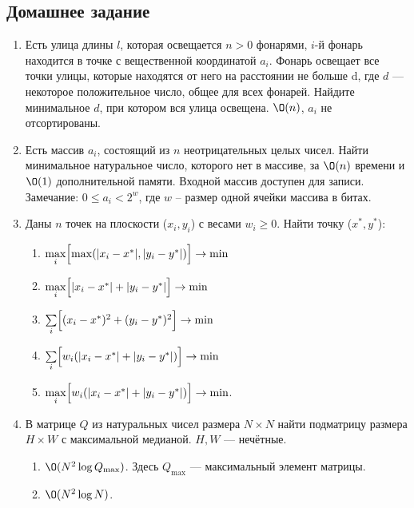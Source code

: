 \subsection{Домашнее задание}
\begin{enumerate}
  \item
    Есть улица длины $l$, которая освещается $n > 0$ фонарями, $i$-й фонарь находится в
    точке с вещественной координатой $a_i$. Фонарь освещает все точки улицы, которые находятся от него на расстоянии не больше d, где $d$ — некоторое
    положительное число, общее для всех фонарей.
    Найдите минимальное $d$, при котором вся улица освещена. $\O(n)$, $a_i$ не отсортированы.

  \item
    Есть массив $a_i$, состоящий из $n$ неотрицательных целых чисел. Найти минимальное натуральное
    число, которого нет в массиве, за $\O(n)$ времени и $\O(1)$ дополнительной памяти.
    Входной массив доступен для записи. \\
    Замечание: $0 \leq a_i < 2^w$, где $w$ -- размер одной ячейки массива в битах.

  \item
    Даны $n$ точек на плоскости ($x_i, y_i$) с весами $w_i \ge 0$. Найти точку ($x^{*}, y^{*}$):
    \begin{enumerate}
      \item {} $\max\limits_i \Bigl[ \max(|x_i-x^{*}|, |y_i-y^{*}|) \Bigr] \rightarrow \min$
      \item {} $\max\limits_i \Bigl[ |x_i-x^{*}|+|y_i-y^{*}|  \Bigr] \rightarrow \min$
      \item {} $\sum\limits_i \Bigl[ (x_i-x^{*})^2+(y_i-y^{*})^2  \Bigr] \rightarrow \min$
      \item $\sum\limits_i \Bigl[ w_i(|x_i-x^{*}|+|y_i-y^{*}|) \Bigr] \rightarrow \min$
      \item $\max\limits_i \Bigl[ w_i(|x_i-x^{*}|+|y_i-y^{*}|) \Bigr] \rightarrow \min$.
    \end{enumerate}

  \item
    В матрице $Q$ из натуральных чисел размера $N \times N$ найти подматрицу размера $H \times W$
    с максимальной медианой. $H, W$ --- нечётные.
    \begin{enumerate}
      \item $\O(N^2 \log{Q_{\max}})$. Здесь $Q_{\max}$ --- максимальный элемент матрицы.
      \item $\O(N^2 \log{N})$.
    \end{enumerate}


\end{enumerate}
